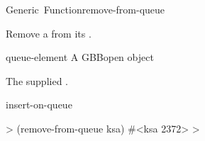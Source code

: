 \documentclass[10pt,twoside,english,pdftex]{article}
\begin{document}
\begin{functiondoc}{Generic~Function}{remove-from-queue}%
  { 
    \returns{} }
%

\fnsyntax

\fnpurpose Remove a  from its .

\fnmethods
{}%
  {\code{(} 
   \returns{} }

\fnpackage {}

\fnmodule {}

\fnargs
\begin{args}{queue-element}
 A GBBopen  object
\end{args}

\fnreturns The supplied .

\begin{alsos}{insert-on-queue}
\end{alsos}

\fnexample
%
\W\supp
\begin{example}
  > (remove-from-queue ksa)
  #<ksa 2372>
  >
\end{example}

\end{functiondoc}

\end{document}
